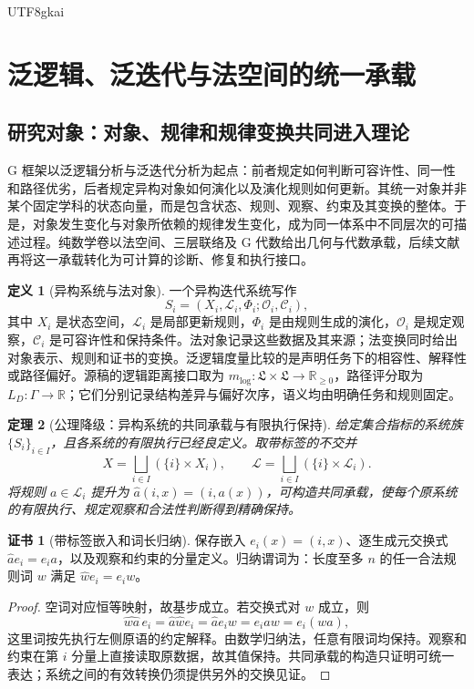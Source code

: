 \documentclass[11pt,a4paper]{article}
\theoremstyle{plain}
\newtheorem{theorem}{定理}[section]
\theoremstyle{definition}
\newtheorem{definition}[theorem]{定义}
\newtheorem*{certificate}{证书}
\theoremstyle{remark}
\begin{document}
\begin{CJK*}{UTF8}{gkai}
\section{泛逻辑、泛迭代与法空间的统一承载}
\label{fa:foundation}

\subsection{研究对象：对象、规律和规律变换共同进入理论}

G 框架以泛逻辑分析与泛迭代分析为起点：前者规定如何判断可容许性、同一性和路径优劣，后者规定异构对象如何演化以及演化规则如何更新。其统一对象并非某个固定学科的状态向量，而是包含状态、规则、观察、约束及其变换的整体。于是，对象发生变化与对象所依赖的规律发生变化，成为同一体系中不同层次的可描述过程。纯数学卷以法空间、三层联络及 G 代数给出几何与代数承载，后续文献再将这一承载转化为可计算的诊断、修复和执行接口。\cite{S01,S05,S06,S10}

\begin{definition}[异构系统与法对象]
\label{fa:def-lawsystem}
一个异构迭代系统写作
\[
 S_i=(X_i,\mathcal L_i,\Phi_i;\mathcal O_i,\mathcal C_i),
\]
其中 $X_i$ 是状态空间，$\mathcal L_i$ 是局部更新规则，$\Phi_i$ 是由规则生成的演化，$\mathcal O_i$ 是规定观察，$\mathcal C_i$ 是可容许性和保持条件。法对象记录这些数据及其来源；法变换同时给出对象表示、规则和证书的变换。泛逻辑度量比较的是声明任务下的相容性、解释性或路径偏好。源稿的逻辑距离接口取为 $m_{\mathrm{log}}:\mathfrak L\times\mathfrak L\to\mathbb R_{\ge0}$，路径评分取为 $L_D:\Gamma\to\mathbb R$；它们分别记录结构差异与偏好次序，语义均由明确任务和规则固定。
\end{definition}

\begin{theorem}[公理降级：异构系统的共同承载与有限执行保持]
\label{fa:thm-carrier}
给定集合指标的系统族 $\{S_i\}_{i\in I}$，且各系统的有限执行已经良定义。取带标签的不交并
\[
 X=\bigsqcup_{i\in I}(\{i\}\times X_i),\qquad
 \mathcal L=\bigsqcup_{i\in I}(\{i\}\times\mathcal L_i).
\]
将规则 $a\in\mathcal L_i$ 提升为 $\widehat a(i,x)=(i,a(x))$，可构造共同承载，使每个原系统的有限执行、规定观察和合法性判断得到精确保持。
\end{theorem}
\begin{certificate}[带标签嵌入和词长归纳]
保存嵌入 $e_i(x)=(i,x)$、逐生成元交换式 $\widehat a e_i=e_i a$，以及观察和约束的分量定义。归纳谓词为：长度至多 $n$ 的任一合法规则词 $w$ 满足 $\widehat w e_i=e_i w$。
\end{certificate}
\begin{proof}
空词对应恒等映射，故基步成立。若交换式对 $w$ 成立，则
\[
 \widehat{wa}\,e_i=\widehat a\widehat w e_i
 =\widehat a e_iw=e_i a w=e_i(wa),
\]
这里词按先执行左侧原语的约定解释。由数学归纳法，任意有限词均保持。观察和约束在第 $i$ 分量上直接读取原数据，故其值保持。共同承载的构造只证明可统一表达；系统之间的有效转换仍须提供另外的交换见证。
\end{proof}


\end{CJK*}
\end{document}
